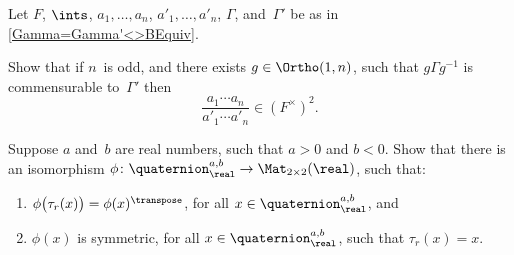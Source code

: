 \begin{exercises}

\item \label{Gamma=Gamma'(nodd)->disc}
 Let $F$, $\ints$, $a_1,\ldots,a_n$,
$a'_1,\ldots,a'_n$, $\Gamma$, and~$\Gamma'$ be as in
\cref{Gamma=Gamma'<>BEquiv}.

Show that if $n$~is odd, and there exists $g \in \Ortho(1,n)$, such
that $g \Gamma g^{-1}$ is commensurable to~$\Gamma'$ then
 $$ \frac{a_1 \cdots a_n}{a'_1 \cdots a'_n} \in
(F^\times)^2 .$$
%

\item \label{QuatEigsGammaNeg}
 Suppose $a$ and~$b$ are real numbers,
such that $a > 0$ and $b < 0$. Show that there is
an isomorphism $\phi \colon \quaternion^{a,b}_\real \to
\Mat_{2 \times 2}(\real)$, such that:
 \begin{enumerate}
 \item $\phi \bigl( \tau_r(x) \bigr) = \phi(x)^\transpose$,
for all $x \in \quaternion^{a,b}_\real$,
and
 \item $\phi(x)$ is symmetric, for all $x \in
\quaternion^{a,b}_\real$, such that $\tau_r(x) = x$.
 \end{enumerate}


\end{exercises}
